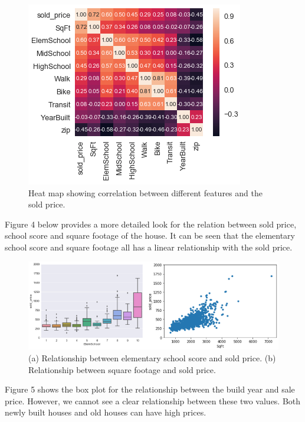 \documentclass{article} %
\begin{document}
\begin{figure}[H]
	\begin{center}
		\includegraphics[width=0.5\linewidth]{fig/heatmap.png}
	\end{center}
	\caption{Heat map showing correlation between different features and the sold price.}
\end{figure}

Figure 4 below provides a more detailed look for the relation between sold price, school score and square footage of the house.
It can be seen that the elementary school score and square footage 
all has a linear relationship with the sold price.

\begin{figure}[H]
	\begin{center}
		\includegraphics[width=0.85\linewidth]{fig/cmp.png}
	\end{center}
	\caption{(a) Relationship between elementary school score and sold price. (b) Relationship between square footage and sold price.}
\end{figure}

Figure 5 shows the box plot for the relationship between the build year and sale price.
However, we cannot see a clear relationship between these two values.
Both newly built houses and old houses can have high prices.
\end{document}
